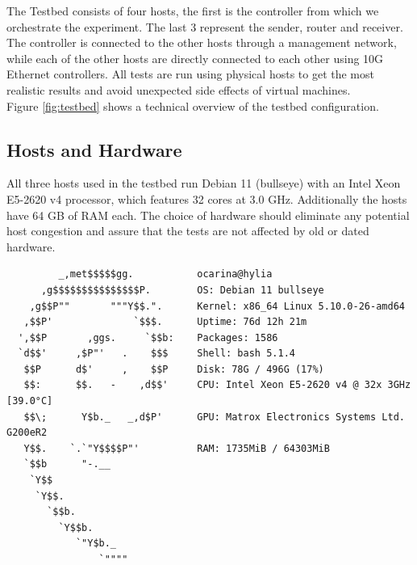 \documentclass[a4paper,english, 11pt]{report}
\begin{document}
The Testbed consists of four hosts, the first is the controller from which we orchestrate the experiment. The last 3 represent the sender, router and receiver. The controller is connected to the other hosts through a management network, while each of the other hosts are directly connected to each other using 10G Ethernet controllers. All tests are run using physical hosts to get the most realistic results and avoid unexpected side effects of virtual machines.\\

Figure \ref{fig:testbed} shows a technical overview of the testbed configuration.

\subsection{Hosts and Hardware}
All three hosts used in the testbed run Debian 11 (bullseye) with an Intel Xeon E5-2620 v4 processor, which features 32 cores at 3.0 GHz. Additionally the hosts have 64 GB of RAM each. The choice of hardware should eliminate any potential host congestion\cite{Agarwal_Krishnamurthy_Agarwal_2023} and assure that the tests are not affected by old or dated hardware.\\

\noindent\begin{minipage}{\linewidth}
\begin{verbatim}
         _,met$$$$$gg.           ocarina@hylia
      ,g$$$$$$$$$$$$$$$P.        OS: Debian 11 bullseye
    ,g$$P""       """Y$$.".      Kernel: x86_64 Linux 5.10.0-26-amd64
   ,$$P'              `$$$.      Uptime: 76d 12h 21m
  ',$$P       ,ggs.     `$$b:    Packages: 1586
  `d$$'     ,$P"'   .    $$$     Shell: bash 5.1.4
   $$P      d$'     ,    $$P     Disk: 78G / 496G (17%)
   $$:      $$.   -    ,d$$'     CPU: Intel Xeon E5-2620 v4 @ 32x 3GHz [39.0°C]
   $$\;      Y$b._   _,d$P'      GPU: Matrox Electronics Systems Ltd. G200eR2
   Y$$.    `.`"Y$$$$P"'          RAM: 1735MiB / 64303MiB
   `$$b      "-.__
    `Y$$
     `Y$$.
       `$$b.
         `Y$$b.
            `"Y$b._
                `""""
\end{verbatim}
\end{minipage}\\
\end{document}

